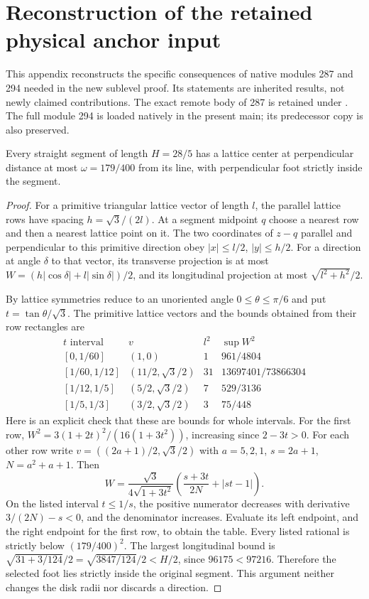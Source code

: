 \section{Reconstruction of the retained physical anchor input}
\label{sec:sc-geometry}
This appendix reconstructs the specific consequences of native modules 287 and 294 needed in the new sublevel proof. Its statements are inherited results, not newly claimed contributions. The exact remote body of 287 is retained under . The full module 294 is loaded natively in the present main; its predecessor copy is also preserved.

\begin{sclemma}\label{lem:sc-buffer}
Every straight segment of length $H=28/5$ has a lattice center at perpendicular distance at most $\omega=179/400$ from its line, with perpendicular foot strictly inside the segment.
\end{sclemma}
\begin{proof}
For a primitive triangular lattice vector of length $l$, the parallel lattice rows have spacing $h=\sqrt3/(2l)$. At a segment midpoint $q$ choose a nearest row and then a nearest lattice point on it. The two coordinates of $z-q$ parallel and perpendicular to this primitive direction obey $|x|\le l/2$, $|y|\le h/2$. For a direction at angle $\delta$ to that vector, its transverse projection is at most
$W=(h|\cos\delta|+l|\sin\delta|)/2$, and its longitudinal projection at most $\sqrt{l^2+h^2}/2$.

By lattice symmetries reduce to an unoriented angle $0\le\theta\le\pi/6$ and put $t=\tan\theta/\sqrt3$. The primitive lattice vectors and the bounds obtained from their row rectangles are
\[
\begin{array}{c|c|c|c}
 t\text{ interval}&v&l^2&\sup W^2\\\hline
 {[0,1/60]}&(1,0)&1&961/4804\\
 {[1/60,1/12]}&(11/2,\sqrt3/2)&31&13697401/73866304\\
 {[1/12,1/5]}&(5/2,\sqrt3/2)&7&529/3136\\
 {[1/5,1/3]}&(3/2,\sqrt3/2)&3&75/448
\end{array}
\]
Here is an explicit check that these are bounds for whole intervals. For the first row,
$W^2=3(1+2t)^2/(16(1+3t^2))$, increasing since $2-3t>0$. For each other row write $v=((2a+1)/2,\sqrt3/2)$ with $a=5,2,1$, $s=2a+1$, $N=a^2+a+1$. Then
\[
 W=\frac{\sqrt3}{4\sqrt{1+3t^2}}
       \left(\frac{s+3t}{2N}+|st-1|\right).
\]
On the listed interval $t\le1/s$, the positive numerator decreases with derivative $3/(2N)-s<0$, and the denominator increases. Evaluate its left endpoint, and the right endpoint for the first row, to obtain the table. Every listed rational is strictly below $(179/400)^2$. The largest longitudinal bound is
$\sqrt{31+3/124}/2=\sqrt{3847/124}/2<H/2$, since $96175<97216$. Therefore the selected foot lies strictly inside the original segment. This argument neither changes the disk radii nor discards a direction.
\end{proof}

